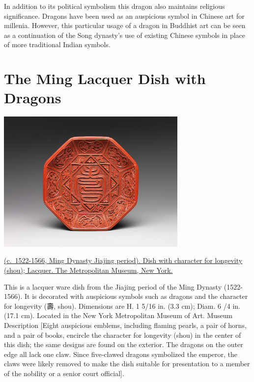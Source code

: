 \documentclass[
]{book}
\begin{document}
In addition to its political symbolism this dragon also maintains religious significance. Dragons have been used as an auspicious symbol in Chinese art for millenia. However, this particular usage of a dragon in Buddhist art can be seen as a continuation of the Song dynasty's use of existing Chinese symbols in place of more traditional Indian symbols.

\hypertarget{the-ming-lacquer-dish-with-dragons}{%
\section*{The Ming Lacquer Dish with Dragons}\label{the-ming-lacquer-dish-with-dragons}}

\includegraphics[width=0.7\textwidth,height=\textheight]{images/Ming_Lacquer_Dish_with_Dragons.png}

\href{https://www.metmuseum.org/art/collection/search/60870}{(c.~1522-1566, Ming Dynasty Jiajing period). Dish with character for longevity (shou); Lacquer. The Metropolitan Museum, New York.}

This is a lacquer ware dish from the Jiajing period of the Ming Dynasty (1522-1566). It is decorated with auspicious symbols such as dragons and the character for longevity (壽, shou). Dimensions are H. 1 5/16 in. (3.3 cm); Diam. 6 /4 in. (17.1 cm). Located in the New York Metropolitan Museum of Art. Museum Description {[}Eight auspicious emblems, including flaming pearls, a pair of horns, and a pair of books, encircle the character for longevity (shou) in the center of this dish; the same designs are found on the exterior. The dragons on the outer edge all lack one claw. Since five-clawed dragons symbolized the emperor, the claws were likely removed to make the dish suitable for presentation to a member of the nobility or a senior court official{]}.
\end{document}
